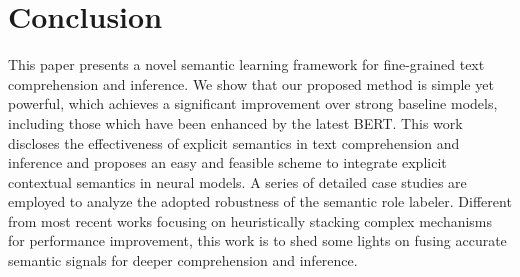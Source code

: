 \documentclass[11pt]{article}
\begin{document}
\section{Conclusion}

This paper presents a novel semantic learning framework for fine-grained text comprehension and inference. We show that our proposed method is simple yet powerful, which achieves a significant improvement over strong baseline models, including those which have been enhanced by the latest BERT. This work discloses the effectiveness of explicit semantics in text comprehension and inference and proposes an easy and feasible scheme to integrate explicit contextual semantics in neural models.  A series of detailed case studies are employed to analyze the adopted robustness of the semantic role labeler. Different from most recent works focusing on heuristically stacking complex mechanisms for performance improvement, this work is to shed some lights on fusing accurate semantic signals for deeper comprehension and inference. 

\end{document}
